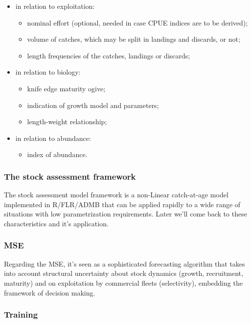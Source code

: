 \documentclass[a4paper,english,10pt]{article}\usepackage[]{graphicx}\usepackage[]{color}
\begin{document}
\begin{itemize}
	\item in relation to exploitation:
	\begin{itemize}
		\item nominal effort (optional, needed in case CPUE indices are to be derived);
		\item volume of catches, which may be split in landings and discards, or not;
		\item length frequencies of the catches, landings or discards;
	\end{itemize}
	\item in relation to biology:
	\begin{itemize}
		\item knife edge maturity ogive;
		\item indication of growth model and parameters;
		\item length-weight relationship;
	\end{itemize}
	\item in relation to abundance:
	\begin{itemize}
		\item index of abundance.
	\end{itemize}	
\end{itemize}

\subsubsection{The stock assessment framework}

The stock assessment model framework is a non-Linear catch-at-age model implemented in R/FLR/ADMB that can be applied rapidly to a wide range of situations with low parametrization requirements. Later we'll come back to these characteristics and it's application.

\subsubsection{MSE}

Regarding the MSE, it's seen as a sophisticated forecasting algorithm that takes into account structural uncertainty about stock dynamics (growth, recruitment, maturity) and on exploitation by commercial fleets (selectivity), embedding the framework of decision making. 

\subsubsection{Training}
\end{document}
